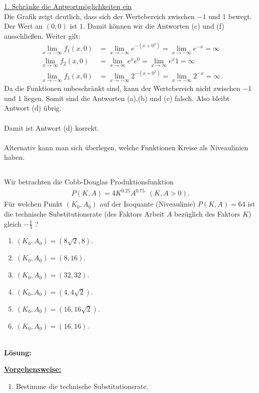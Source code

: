 \underline{1. Schränke die Antwortmöglichkeiten ein}\\
Die Grafik zeigt deutlich, dass sich der Wertebereich zwischen $ -1 $ und $ 1 $ bewegt. Der Wert an $ (0,0) $ ist $ 1 $.
Damit können wir die Antworten (c) und (f) ausschließen.
Weiter gilt:
\begin{align*}
	\lim \limits_{x \to -\infty}
	f_1(x,0) 
	&=
	\lim \limits_{x \to -\infty} e^{-(x +0^2)} 
	= 
	\lim \limits_{x \to -\infty} e^{-x} = \infty\\
	\lim \limits_{x \to \infty}
	f_2(x,0) 
	&=
	\lim \limits_{x \to \infty}
	e^x e^0 
	=
	\lim \limits_{x \to \infty}
	e^x 1 
	=
	\infty\\
		\lim \limits_{x \to -\infty}
	f_5(x,0) 
	&=
	\lim \limits_{x \to -\infty} 2^{-(x +0^2)} 
	= 
	\lim \limits_{x \to -\infty} 2^{-x} = \infty
\end{align*}
Da die Funktionen unbeschränkt sind, kann der Wertebereich nicht zwischen $ -1 $ und $ 1 $ liegen.
Somit sind die Antworten (a),(b) und (e) falsch. Also bleibt Antwort (d) übrig.\\
\\
Damit ist Antwort (d) korrekt.
\\
\\
Alternativ kann man sich überlegen, welche Funktionen Kreise als Niveaulinien haben.


\newpage

\subsection*{}
Wir betrachten die Cobb-Douglas Produktionsfunktion
\begin{align*}
	P(K,A) 
	=
	4 K^{0.25} A^{0.75} \ \ (K,A > 0).
\end{align*}
Für welchen Punkt $ (K_0, A_0) $ auf der Isoquante (Niveaulinie) $ P(K,A) = 64 $ ist die technische Substitutionsrate (des Faktors Arbeit $ A $ bezüglich des Faktors $ K $) gleich $ - \frac{1}{3} $ ?
\renewcommand{\labelenumi}{(\alph{enumi})}
\begin{enumerate}
	\item 
	$ (K_0, A_0) = ( 8 \sqrt{2}, 8 ) $.
	\item
	$ (K_0, A_0) = ( 8 , 16 )$.
	\item
	$ (K_0, A_0) = ( 32 , 32)$.
	\item
	$ (K_0, A_0) = ( 4 , 4\sqrt{2})$.
	\item
	$ (K_0, A_0) = ( 16 , 16\sqrt{2})$.
	\item
	$ (K_0, A_0) = ( 16 , 16)$.
\end{enumerate}
\ \\
\textbf{Lösung:}
\begin{mdframed}
\underline{\textbf{Vorgehensweise:}}
\renewcommand{\labelenumi}{\theenumi.}
\begin{enumerate}
\item Bestimme die technische Substitutionsrate.
\end{enumerate}
\end{mdframed}


